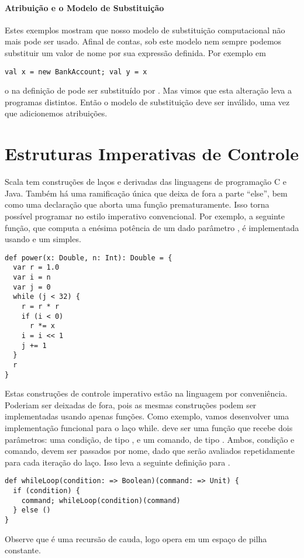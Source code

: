 \paragraph{Atribuição e o Modelo de Substituição} 

Estes exemplos mostram que nosso modelo de substituição computacional não mais pode ser usado. Afinal de contas,
sob este modelo nem sempre podemos substituir um valor de nome por sua expressão definida. 
Por exemplo em
\begin{lstlisting}
val x = new BankAccount; val y = x
\end{lstlisting}
o  na definição de  pode ser substituído por . Mas vimos que esta 
alteração leva a programas distintos. Então o modelo de substituição deve ser inválido, uma vez que adicionemos
atribuições.

\section{Estruturas Imperativas de Controle}

Scala tem construções de laços  e  derivadas das linguagens de programação C e Java. 
Também há uma ramificação única  que deixa de fora a parte ``else'', bem como uma declaração 
 que aborta uma função prematuramente. Isso torna possível programar no estilo imperativo 
convencional. Por exemplo, a seguinte função, que computa a en\'{e}sima potência de um dado parâmetro ,
é implementada usando  e um  simples.
 
\begin{lstlisting}
def power(x: Double, n: Int): Double = {
  var r = 1.0
  var i = n
  var j = 0
  while (j < 32) {
    r = r * r
    if (i < 0)
      r *= x
    i = i << 1
    j += 1
  }
  r
}
\end{lstlisting}
Estas construções de controle imperativo estão na linguagem por conveniência. Poderiam ser deixadas de fora, 
pois as mesmas construções podem ser implementadas usando apenas funções. Como exemplo, vamos desenvolver uma 
implementação funcional para o laço while.  deve ser uma função que recebe dois parâmetros:
uma condição, de tipo , e um comando, de tipo . Ambos, condição e comando, devem 
ser passados por nome, dado que serão avaliados repetidamente para cada iteração do laço. Isso leva a seguinte 
definição para . 

\begin{lstlisting}
def whileLoop(condition: => Boolean)(command: => Unit) {
  if (condition) {
    command; whileLoop(condition)(command)
  } else ()
}
\end{lstlisting}
Observe que  é uma recursão de cauda, logo opera em um espaço de pilha constante.

